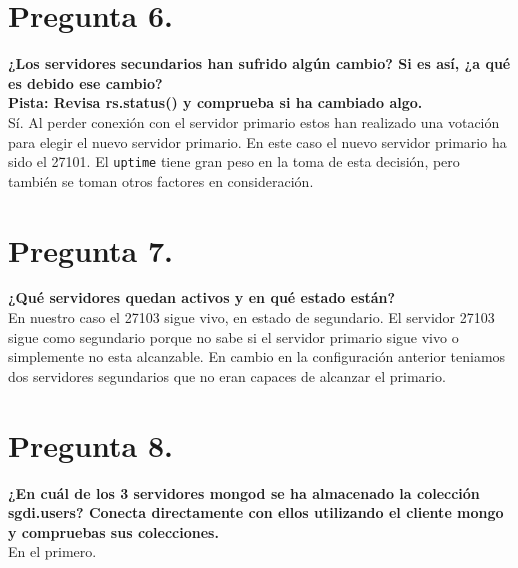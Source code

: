 \documentclass{article}
\begin{document}
  \section{Pregunta 6.}
  \textbf{¿Los servidores secundarios han sufrido algún cambio? Si es así, ¿a qué es debido ese cambio? \\
  Pista: Revisa rs.status() y comprueba si ha cambiado algo. \\}
    Sí. Al perder conexión con el servidor primario estos han realizado una
    votación para elegir el nuevo servidor primario. En este caso el nuevo
    servidor primario ha sido el 27101. El \texttt{uptime} tiene gran peso en
    la toma de esta decisión, pero también se toman otros factores en
    consideración.

  \section{Pregunta 7.}
  \textbf{¿Qué servidores quedan activos y en qué estado están?\\}
    En nuestro caso el 27103 sigue vivo, en estado de segundario. El servidor
    27103 sigue como segundario porque no sabe si el servidor primario sigue
    vivo o simplemente no esta alcanzable. En cambio en la configuración
    anterior teniamos dos servidores segundarios que no eran capaces de
    alcanzar el primario. 

  \section{Pregunta 8.}
  \textbf{¿En cuál de los 3 servidores mongod se ha almacenado la
  colección sgdi.users? Conecta directamente con ellos utilizando el cliente
  mongo y compruebas sus colecciones.\\}
    En el primero.

  \newpage
\end{document}
